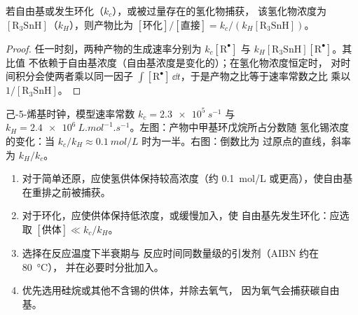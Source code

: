 \begin{proposition}[竞争动力学]\label{prop:b3:radicals-carbenes:clock}
若自由基或发生环化（$k_c$），或被过量存在的氢化物捕获，
该氢化物浓度为 $[\mathrm{R_3SnH}]$（$k_H$），则产物比为
$[\text{环化}]/[\text{直接}] = k_c/(k_H[\mathrm{R_3SnH}])$。
\end{proposition}

\begin{proof}
任一时刻，两种产物的生成速率分别为 $k_c[\mathrm R^\bullet]$ 与 $k_H[\mathrm{R_3SnH}][\mathrm R^\bullet]$。其比值
不依赖于自由基浓度（自由基浓度是变化的）；在氢化物浓度恒定时，
对时间积分会使两者乘以同一因子
$\int[\mathrm R^\bullet]\,\dd t$，于是产物之比等于速率常数之比
乘以 $1/[\mathrm{R_3SnH}]$。
\end{proof}

\begin{omfigure}

{\small 己-5-烯基时钟，模型速率常数 $k_c = \qty{2.3e5}{s^{-1}}$ 与
$k_H = \qty{2.4e6}{L.mol^{-1}.s^{-1}}$。左图：产物中甲基环戊烷所占分数随
氢化锡浓度的变化：当 $k_c/k_H \approx \qty{0.1}{mol/L}$ 时为一半。右图：倒数比为
过原点的直线，斜率为 $k_H/k_c$。}
\end{omfigure}

\begin{method}[设计自由基还原或环化]\label{met:b3:radicals-carbenes:radical-chain}
\begin{enumerate}
  \item 对于简单还原，应使氢供体保持较高浓度（约
        \qty{0.1}{mol/L} 或更高），使自由基在重排之前被捕获。
  \item 对于环化，应使供体保持低浓度，或缓慢加入，使
        自由基先发生环化：应选取 $[\text{供体}] \ll k_c/k_H$。
  \item 选择在反应温度下半衰期与
        反应时间同数量级的引发剂（AIBN 约在 \qty{80}{\celsius}），
        并在必要时分批加入。
  \item 优先选用硅烷或其他不含锡的供体，并除去氧气，
        因为氧气会捕获碳自由基。
\end{enumerate}
\end{method}

